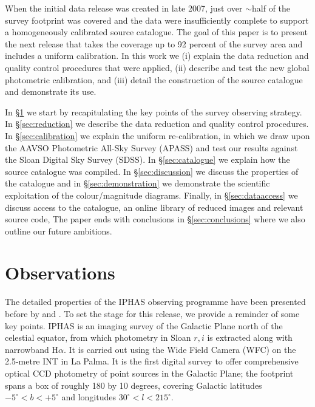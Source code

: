 \documentclass[useAMS,usenatbib]{mn2e}
\begin{document}
When the initial data release was created in late 2007,
just over $\sim$half of the survey footprint was covered
and the data were insufficiently complete 
to support a homogeneously calibrated source catalogue.
The goal of this paper is to present the next release 
that takes the coverage up to 92 percent of the survey area 
and includes a uniform calibration.
In this work we
(i) explain the data reduction 
and quality control procedures that were applied,
(ii) describe and test the new global photometric calibration, and 
(iii) detail the construction of the source catalogue
and demonstrate its use.

In \S\ref{sec:observations} we start by recapitulating the key points
of the survey observing strategy.
In \S\ref{sec:reduction} we describe the data reduction
and quality control procedures.
In \S\ref{sec:calibration} we explain the uniform re-calibration, in which
we draw upon the AAVSO Photometric All-Sky Survey (APASS)
and test our results against the Sloan Digital Sky Survey (SDSS).
In \S\ref{sec:catalogue} we explain how the source catalogue was compiled.
In \S\ref{sec:discussion} we discuss the properties of the catalogue
and in \S\ref{sec:demonstration} we demonstrate
the scientific exploitation of the colour/magnitude diagrams.
Finally, in \S\ref{sec:dataaccess} we discuss access
to the catalogue, an online library of reduced images and relevant source code,
The paper ends with conclusions in \S\ref{sec:conclusions} where we also outline
our future ambitions.

\section{Observations}
\label{sec:observations}

The detailed properties of the IPHAS observing programme 
have been presented before 
by \citet{Drew2005} and \citet{Gonzalez-Solares2008}. 
To set the stage for this release, we provide a reminder of some key points.
IPHAS is an imaging survey of the Galactic Plane north of the celestial equator, 
from which photometry in Sloan $r, i$ 
is extracted along with narrowband H$\alpha$. 
It is carried out using the Wide Field Camera (WFC) 
on the 2.5-metre INT in La Palma. 
It is the first digital survey to offer comprehensive optical CCD photometry
of point sources in the Galactic Plane;
the footprint spans a box 
of roughly 180 by 10 degrees, 
covering Galactic latitudes $-5^{\circ} < b < +5^{\circ}$ 
and longitudes $30^{\circ} < l < 215^{\circ}$.
\end{document}
